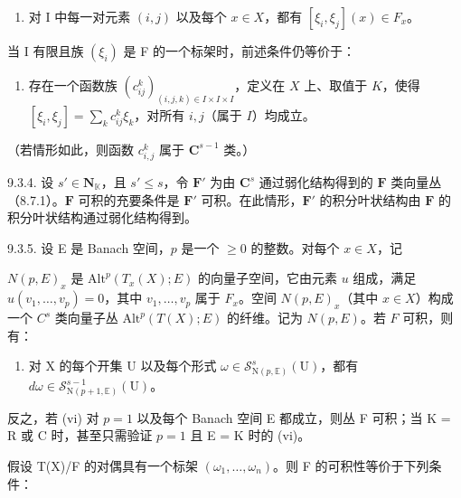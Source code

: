 \begin{enumerate}
\def\labelenumi{(\roman{enumi})}
\setcounter{enumi}{3}
\tightlist
\item
  对 I 中每一对元素 \((i,j)\) 以及每个 \(x\in X\)，都有 \([\xi_i,\xi_j](x)\in F_x\)。
\end{enumerate}

当 I 有限且族 \((\xi_{i})\) 是 F 的一个标架时，前述条件仍等价于：

\begin{enumerate}
\def\labelenumi{(\alph{enumi})}
\setcounter{enumi}{21}
\tightlist
\item
  存在一个函数族 \((c_{ij}^{k})_{(i,j,k)\in I\times I\times I}\)，定义在 \(X\) 上、取值于 \(K\)，使得 \([\xi_i,\xi_j] = \sum_{k}c_{ij}^k\xi_k\)，对所有 \(i,j\)（属于 \(I\)）均成立。
\end{enumerate}

（若情形如此，则函数 \(c_{i,j}^{k}\) 属于 \(\mathbf{C}^{s-1}\) 类。）

9.3.4. 设 \(s' \in \mathbf{N}_{\mathbb{K}}\)，且 \(s' \leqslant s\)，令 \(\mathbf{F}'\) 为由 \(\mathbf{C}^{s}\) 通过弱化结构得到的 \(\mathbf{F}\) 类向量丛（8.7.1）。\(\mathbf{F}\) 可积的充要条件是 \(\mathbf{F}'\) 可积。在此情形，\(\mathbf{F}'\) 的积分叶状结构由 \(\mathbf{F}\) 的积分叶状结构通过弱化结构得到。

9.3.5. 设 E 是 Banach 空间，\(p\) 是一个 \(\geqslant 0\) 的整数。对每个 \(x \in X\)，记

\(N(p, E)_{x}\) 是 \(\text{Alt}^{p}(T_{x}(X); E)\) 的向量子空间，它由元素 \(u\) 组成，满足 \(u(v_{1}, \ldots, v_{p}) = 0\)，其中 \(v_{1}, \ldots, v_{p}\) 属于 \(F_{x}\)。空间 \(N(p, E)_{x}\)（其中 \(x \in X\)）构成一个 \(C^{s}\) 类向量子丛 \(\text{Alt}^{p}(T(X); E)\) 的纤维。记为 \(N(p, E)\)。若 \(F\) 可积，则有：

\begin{enumerate}
\def\labelenumi{(\roman{enumi})}
\setcounter{enumi}{5}
\tightlist
\item
  对 X 的每个开集 U 以及每个形式 \(\omega \in \mathcal{S}_{\mathrm{N}(p,\mathbb{E})}^s (\mathrm{U})\)，都有 \(d\omega \in \mathcal{S}_{\mathrm{N}(p + 1,\mathbb{E})}^{s - 1}(\mathrm{U})\)。
\end{enumerate}

反之，若 (vi) 对 \(p=1\) 以及每个 Banach 空间 E 都成立，则丛 F 可积；当 K = R 或 C 时，甚至只需验证 \(p=1\) 且 E = K 时的 (vi)。

假设 T(X)/F 的对偶具有一个标架 \((\omega_{1},\ldots,\omega_{n})\)。则 F 的可积性等价于下列条件：

